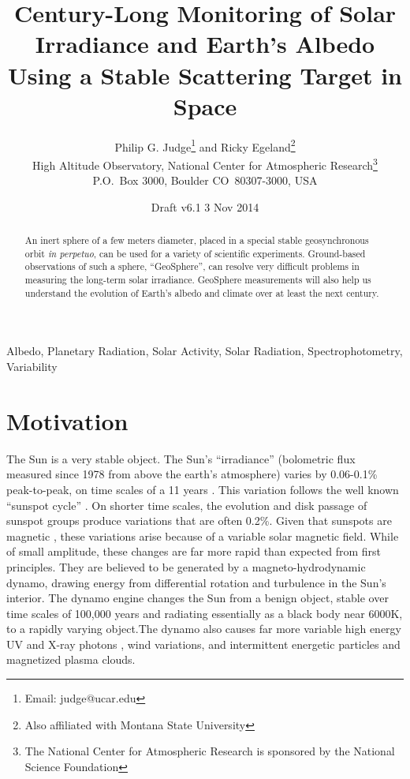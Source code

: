 \documentclass[useAMS,usenatbib]{mn2e}
\title[\name]{Century-Long Monitoring of Solar Irradiance and Earth's Albedo 
Using a Stable Scattering Target in Space}
\author[Philip Judge and Ricky Egeland]
{Philip G. Judge\thanks{Email: judge@ucar.edu} and Ricky Egeland\thanks{Also affiliated with Montana State University}\\
High Altitude Observatory,
       National Center for Atmospheric Research\thanks{The National %
       Center for Atmospheric Research is sponsored by the %
       National Science Foundation}\\
       P.O.~Box 3000, Boulder CO~80307-3000, USA}
\newcommand{\highlight}{\color{red} }
\renewcommand{\highlight}{}
\newcommand\name{LAMBERT}
\renewcommand\name{GeoSphere}
\begin{document}
\date{Draft v6.1 3 Nov 2014}

\pagerange{\pageref{firstpage}--\pageref{lastpage}} 

\maketitle

\label{firstpage}

%
%

\begin{abstract}
%
An inert sphere of a few meters diameter, placed in a special stable
geosynchronous orbit {\em in perpetuo}, 
 can be used for a variety of scientific
experiments.  
Ground-based observations of such
a sphere, ``\name{}'', can resolve very difficult problems in
measuring the long-term solar irradiance.  \name{} measurements will
also help us understand the evolution of Earth's albedo and 
climate over at least the next
century.  
\end{abstract}

\begin{keywords}
Albedo, Planetary Radiation, Solar Activity, Solar Radiation, Spectrophotometry, Variability
\end{keywords}

\section{Motivation}

The Sun is a very stable object.  {\highlight The Sun's
``irradiance'' (bolometric flux measured since 1978 from above the earth's
atmosphere) varies by 0.06-0.1\%{} peak-to-peak, on time scales of a
11 years \citep[see, for example, recent reviews by][]{Frohlich2013, Willson2014}.  }
This variation follows the well known
``sunspot cycle'' \citep{Schwabe1844}. On shorter time scales, 
the evolution and disk passage of sunspot groups
produce variations that are often 0.2\%.
Given that sunspots are magnetic \citep{Hale1908b}, these variations
arise because of a variable solar magnetic field. While of 
small amplitude, these changes are
far more rapid than expected from first principles. They are believed
to be generated by a magneto-hydrodynamic dynamo, drawing energy from
differential rotation and turbulence in the Sun's interior. The dynamo 
engine changes the Sun from a benign object, stable over time scales of 
100,000 years and radiating essentially as a black body near 6000K, to 
a rapidly varying object.{\highlight The dynamo also causes far more variable
high energy UV and X-ray photons \citep{White1977},} 
wind variations, and intermittent
energetic particles and magnetized plasma clouds.  
\end{document}

